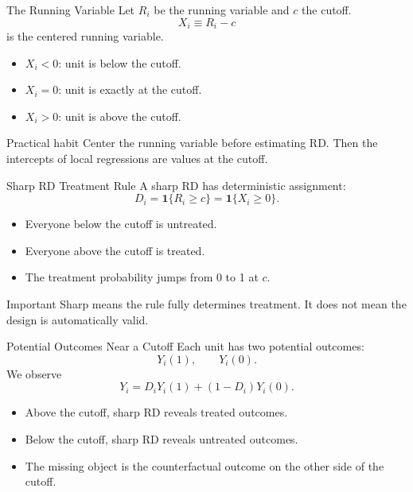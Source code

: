 \documentclass[11pt,aspectratio=169]{beamer}
\begin{document}
\begin{frame}{The Running Variable}
  Let \(R_i\) be the running variable and \(c\) the cutoff.
  \[
    X_i \equiv R_i-c
  \]
  is the centered running variable.
  \begin{itemize}
    \item \(X_i<0\): unit is below the cutoff.
    \item \(X_i=0\): unit is exactly at the cutoff.
    \item \(X_i>0\): unit is above the cutoff.
  \end{itemize}
  \begin{block}{Practical habit}
    Center the running variable before estimating RD. Then the intercepts of local regressions are values at the cutoff.
  \end{block}
\end{frame}

\begin{frame}{Sharp RD Treatment Rule}
  \hypertarget{main:sharp-rule}{}
  A sharp RD has deterministic assignment:
  \[
    D_i = \mathbf{1}\{R_i \geq c\}
    =
    \mathbf{1}\{X_i \geq 0\}.
  \]
  \begin{itemize}
    \item Everyone below the cutoff is untreated.
    \item Everyone above the cutoff is treated.
    \item The treatment probability jumps from 0 to 1 at \(c\).
  \end{itemize}
  \begin{block}{Important}
    Sharp means the rule fully determines treatment. It does not mean the design is automatically valid.
  \end{block}
\end{frame}

\begin{frame}{Potential Outcomes Near a Cutoff}
  Each unit has two potential outcomes:
  \[
    Y_i(1), \qquad Y_i(0).
  \]
  We observe
  \[
    Y_i = D_iY_i(1)+(1-D_i)Y_i(0).
  \]
  \begin{itemize}
    \item Above the cutoff, sharp RD reveals treated outcomes.
    \item Below the cutoff, sharp RD reveals untreated outcomes.
    \item The missing object is the counterfactual outcome on the other side of the cutoff.
  \end{itemize}
\end{frame}
\end{document}
